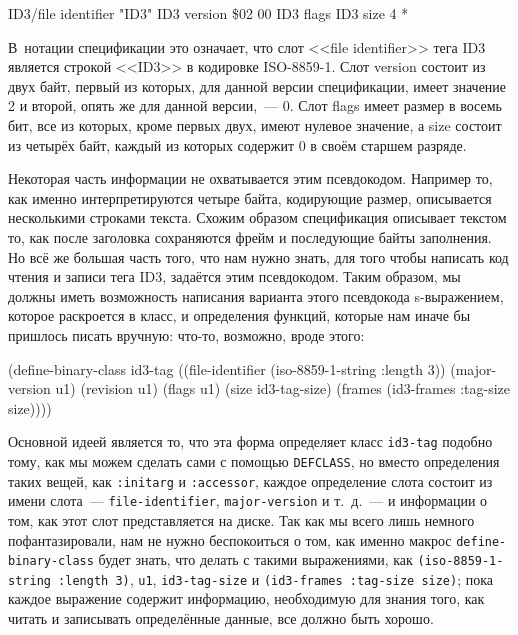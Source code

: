 \begin{myverb}
ID3/file identifier      "ID3"
ID3 version              \$02 00
ID3 flags                %
ID3 size             4 * %
\end{myverb}

В~нотации спецификации это означает, что слот <<file identifier>> тега ID3 является строкой
<<ID3>> в кодировке ISO-8859-1. Слот version состоит из двух байт, первый из которых, для
данной версии спецификации, имеет значение 2 и второй, опять же для данной версии,~---
0. Слот flags имеет размер в восемь бит, все из которых, кроме первых двух, имеют нулевое
значение, а size состоит из четырёх байт, каждый из которых содержит 0 в своём старшем
разряде.

Некоторая часть информации не охватывается этим псевдокодом. Например то, как именно
интерпретируются четыре байта, кодирующие размер, описывается несколькими строками
текста. Схожим образом спецификация описывает текстом то, как после заголовка сохраняются
фрейм и последующие байты заполнения. Но всё же большая часть того, что нам нужно знать,
для того чтобы написать код чтения и записи тега ID3, задаётся этим псевдокодом. Таким
образом, мы должны иметь возможность напи\-сания варианта этого псевдокода s-выражением,
которое раскроется в класс, и определения функций, которые нам иначе бы пришлось писать
вручную: что-то, возможно, вроде этого:

\begin{myverb}
(define-binary-class id3-tag
  ((file-identifier (iso-8859-1-string :length 3))
   (major-version   u1)
   (revision        u1)
   (flags           u1)
   (size            id3-tag-size)
   (frames          (id3-frames :tag-size size))))
\end{myverb}

Основной идеей является то, что эта форма определяет класс \lstinline{id3-tag} подобно тому,
как мы можем сделать сами с помощью \lstinline{DEFCLASS}, но вместо определения таких вещей,
как \lstinline{:initarg} и \lstinline{:accessor}, каждое определение слота состоит из имени
слота~--- \lstinline{file-identifier}, \lstinline{major-version} и т.~д.~--- и информации о том, как
этот слот представляется на диске. Так как мы всего лишь немного пофантазировали, нам не
нужно беспокоиться о том, как именно макрос \lstinline{define-binary-class} будет знать, что
делать с такими выражениями, как \lstinline{(iso-8859-1-string :length 3)}, \lstinline{u1},
\lstinline{id3-tag-size} и \lstinline{(id3-frames :tag-size size)}; пока каждое выражение содержит
информацию, необходимую для знания того, как читать и записывать определённые данные, все
должно быть хорошо.

